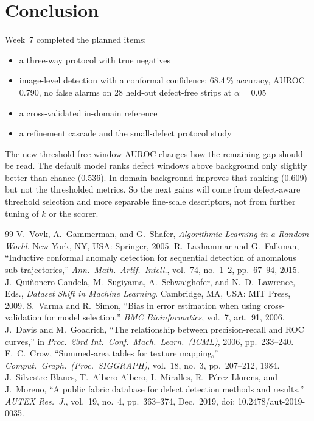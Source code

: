 \documentclass[11pt,a4paper]{article}
\begin{document}
\section*{Conclusion}
Week~7 completed the planned items:
\begin{itemize}
  \item a three-way protocol with true negatives
  \item image-level detection with a conformal confidence: 68.4\,\% accuracy, AUROC 0.790, no false alarms on 28 held-out defect-free strips at $\alpha=0.05$
  \item a cross-validated in-domain reference
  \item a refinement cascade and the small-defect protocol study
\end{itemize}
The new threshold-free window AUROC changes how the remaining gap should be read. The default model ranks defect windows above background only slightly better than chance (0.536). In-domain background improves that ranking (0.609) but not the thresholded metrics. So the next gains will come from defect-aware threshold selection and more separable fine-scale descriptors, not from further tuning of $k$ or the scorer.

\begin{thebibliography}{99}
\small
{} V.~Vovk, A.~Gammerman, and G.~Shafer, \emph{Algorithmic Learning in a Random World}. New York, NY, USA: Springer, 2005.
 R.~Laxhammar and G.~Falkman, ``Inductive conformal anomaly detection for sequential detection of anomalous sub-trajectories,'' \emph{Ann.\ Math.\ Artif.\ Intell.}, vol.~74, no.~1--2, pp.~67--94, 2015.
 J.~Qui\~nonero-Candela, M.~Sugiyama, A.~Schwaighofer, and N.~D.~Lawrence, Eds., \emph{Dataset Shift in Machine Learning}. Cambridge, MA, USA: MIT Press, 2009.
 S.~Varma and R.~Simon, ``Bias in error estimation when using cross-validation for model selection,'' \emph{BMC Bioinformatics}, vol.~7, art.~91, 2006.
 J.~Davis and M.~Goadrich, ``The relationship between precision-recall and ROC curves,'' in \emph{Proc.\ 23rd Int.\ Conf.\ Mach.\ Learn.\ (ICML)}, 2006, pp.~233--240.
 F.~C.~Crow, ``Summed-area tables for texture mapping,'' \emph{Comput.\ Graph.\ (Proc.\ SIGGRAPH)}, vol.~18, no.~3, pp.~207--212, 1984.
 J.~Silvestre-Blanes, T.~Albero-Albero, I.~Miralles, R.~P\'erez-Llorens, and J.~Moreno, ``A public fabric database for defect detection methods and results,'' \emph{AUTEX Res.\ J.}, vol.~19, no.~4, pp.~363--374, Dec.\ 2019, doi: 10.2478/aut-2019-0035.
\end{thebibliography}
\end{document}
